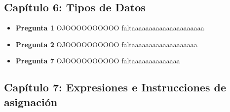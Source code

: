 \documentclass[12pt,oneside]{article}
\begin{document}
		\subsection{Capítulo 6: Tipos de Datos}
			\begin{itemize}
				\item {\bf Pregunta 1}
					OJOOOOOOOOOO faltaaaaaaaaaaaaaaaaaaaaa
				\item {\bf Pregunta 2}
					OJOOOOOOOOOO faltaaaaaaaaaaaaaaaaaaa
				\item {\bf Pregunta 7}
					OJOOOOOOOOOO faltaaaaaaaaaaaaaa
				\end{itemize}

		\subsection{Capítulo 7: Expresiones e Instrucciones de asignación}	
\end{document}
